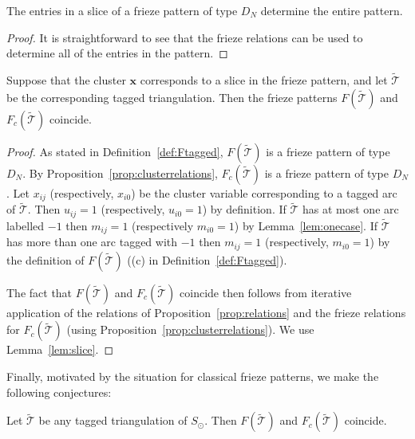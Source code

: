 \documentclass[a4paper]{amsart}
\begin{document}
\begin{lemma} \label{lem:slice}
The entries in a slice of a frieze pattern of type $D_N$ determine
the entire pattern.
\end{lemma}

\begin{proof}
It is straightforward to see that the frieze relations can be used to
determine all of the entries in the pattern.
\end{proof}

\begin{theorem} \label{thm:clustertypeD}
Suppose that the cluster $\mathbf{x}$ corresponds to a slice in the
frieze pattern, and let $\widetilde{\mathcal T}$ be the corresponding tagged
triangulation. Then the frieze patterns $F(\widetilde{\mathcal T})$ and
$F_c(\widetilde{\mathcal T})$ coincide.
\end{theorem}

\begin{proof}
As stated in Definition~\ref{def:Ftagged}, $F(\widetilde{\mathcal T})$ is
a frieze pattern of type $D_N$. By Proposition~\ref{prop:clusterrelations},
$F_c(\widetilde{\mathcal T})$ is a frieze pattern of type $D_N$.
Let $x_{ij}$ (respectively, $x_{i0}$) be the cluster variable corresponding to
a tagged arc of $\widetilde{\mathcal T}$. Then $u_{ij}=1$ (respectively, $u_{i0}=1$) by
definition. If $\widetilde{\mathcal T}$ has at most one arc labelled $-1$ then
$m_{ij}=1$ (respectively $m_{i0}=1$) by Lemma~\ref{lem:onecase}.
If $\widetilde{\mathcal T}$ has more than one arc tagged with $-1$ then $m_{ij}=1$
(respectively, $m_{i0}=1$) by
the definition of $F(\widetilde{\mathcal T})$
((c) in Definition~\ref{def:Ftagged}).

The fact that $F(\widetilde{\mathcal T})$ and $F_c(\widetilde{\mathcal T})$ coincide then
follows from iterative application of the relations of
Proposition~\ref{prop:relations} and the frieze relations for
$F_c(\widetilde{\mathcal T})$ (using Proposition~\ref{prop:clusterrelations}).
We use Lemma~\ref{lem:slice}.
\end{proof}

Finally, motivated by the situation for classical frieze patterns,
we make the following conjectures:

\begin{conjecture}
Let $\widetilde{\mathcal T}$ be any tagged triangulation of $S_{\odot}$.
Then $F(\widetilde{\mathcal T})$ and $F_c(\widetilde{\mathcal T})$ coincide.
\end{conjecture}
\end{document}

